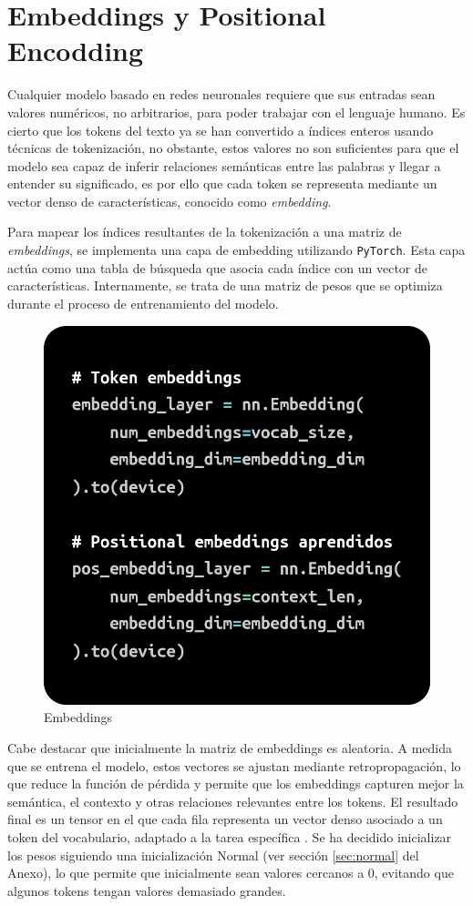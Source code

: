 \documentclass[11pt]{book}
\begin{document}

\section{Embeddings y Positional Encodding}
Cualquier modelo basado en redes neuronales requiere que sus entradas sean valores numéricos, no arbitrarios, para poder trabajar con el lenguaje humano. Es cierto que los tokens del texto ya se han convertido a índices enteros usando técnicas de tokenización, no obstante, estos valores no son suficientes para que el modelo sea capaz de inferir relaciones semánticas entre las palabras y llegar a entender su significado, es por ello que cada token se representa mediante un vector denso de características, conocido como \textit{embedding}.

Para mapear los índices resultantes de la tokenización a una matriz de \textit{embeddings}, se implementa una capa de embedding utilizando \texttt{PyTorch}. Esta capa actúa como una tabla de búsqueda que asocia cada índice con un vector de características. Internamente, se trata de una matriz de pesos que se optimiza durante el proceso de entrenamiento del modelo.

\begin{figure}[h]
    \centering
    \includegraphics[width=0.5\linewidth]{img/embeddings1.png}
    \caption{Embeddings}
    \label{fig:placeholder17}
\end{figure}

Cabe destacar que inicialmente la matriz de embeddings es aleatoria. A medida que se entrena el modelo, estos vectores se ajustan mediante retropropagación, lo que reduce la función de pérdida y permite que los embeddings capturen mejor la semántica, el contexto y otras relaciones relevantes entre los tokens. El resultado final es un tensor en el que cada fila representa un vector denso asociado a un token del vocabulario, adaptado a la tarea específica \parencite{bao2022embedding}. Se ha decidido inicializar los pesos siguiendo una inicialización Normal (ver sección \ref{sec:normal} del Anexo), lo que permite que inicialmente sean valores cercanos a 0, evitando que algunos tokens tengan valores demasiado grandes. 
\end{document}
